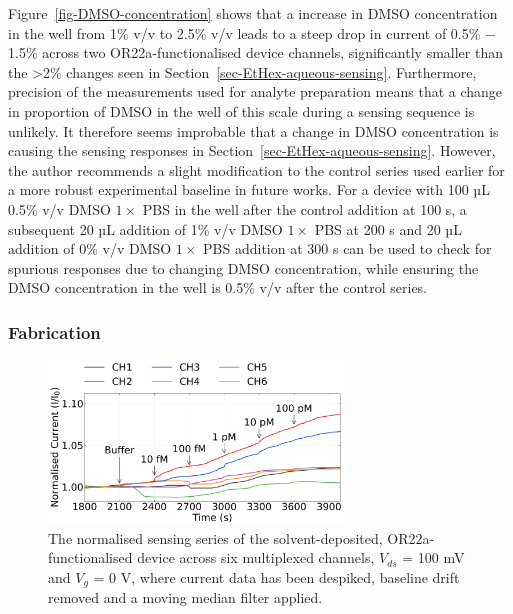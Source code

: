 \documentclass[
  a4paper,
]{scrbook}
\begin{document}
Figure~\ref{fig-DMSO-concentration} shows that a increase in DMSO
concentration in the well from 1\% v/v to 2.5\% v/v leads to a steep
drop in current of 0.5\% \(-\) 1.5\% across two OR22a-functionalised
device channels, significantly smaller than the \textgreater2\% changes
seen in Section~\ref{sec-EtHex-aqueous-sensing}. Furthermore, precision
of the measurements used for analyte preparation means that a change in
proportion of DMSO in the well of this scale during a sensing sequence
is unlikely. It therefore seems improbable that a change in DMSO
concentration is causing the sensing responses in
Section~\ref{sec-EtHex-aqueous-sensing}. However, the author recommends
a slight modification to the control series used earlier for a more
robust experimental baseline in future works. For a device with 100 µL
0.5\% v/v DMSO \(1 \times\) PBS in the well after the control addition
at 100 s, a subsequent 20 µL addition of 1\% v/v DMSO \(1 \times\) PBS
at 200 s and 20 µL addition of 0\% v/v DMSO \(1 \times\) PBS addition at
300 s can be used to check for spurious responses due to changing DMSO
concentration, while ensuring the DMSO concentration in the well is
0.5\% v/v after the control series.

\hypertarget{fabrication}{%
\subsubsection*{Fabrication}\label{fabrication}}

\begin{figure}

{\centering \includegraphics[width=0.7\textwidth,height=\textheight]{figures/ch8/NTQ25C5_OR22a_sample_220126_filtered_detrend_trunc_arrows_normalised.png}

}

\caption{\label{fig-solvent-deposited-sensing}The normalised sensing
series of the solvent-deposited, OR22a-functionalised device across six
multiplexed channels, \(V_{ds}\) = 100 mV and \(V_g\) = 0 V, where
current data has been despiked, baseline drift removed and a moving
median filter applied.}

\end{figure}
\end{document}
